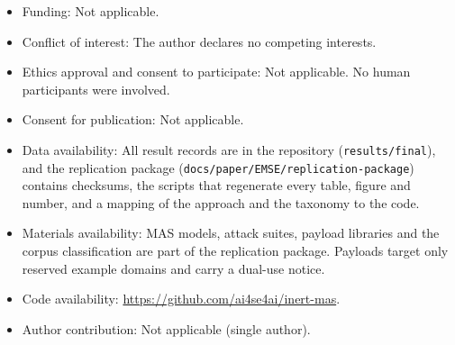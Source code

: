 \documentclass[pdflatex,sn-mathphys-num]{sn-jnl}
\theoremstyle{thmstyleone}%
\theoremstyle{thmstyletwo}%
\theoremstyle{thmstylethree}%
\begin{document}
\begin{itemize}
\item Funding: Not applicable.
\item Conflict of interest: The author declares no competing interests.
\item Ethics approval and consent to participate: Not applicable. No human participants were involved.
\item Consent for publication: Not applicable.
\item Data availability: All result records are in the repository (\texttt{results/final}), and the replication package (\texttt{docs/paper/EMSE/replication-package}) contains checksums, the scripts that regenerate every table, figure and number, and a mapping of the approach and the taxonomy to the code.
\item Materials availability: MAS models, attack suites, payload libraries and the corpus classification are part of the replication package. Payloads target only reserved example domains and carry a dual-use notice.
\item Code availability: \url{https://github.com/ai4se4ai/inert-mas}.
\item Author contribution: Not applicable (single author).
\end{itemize}


\end{document}
